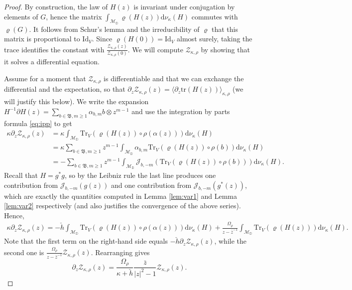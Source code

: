 \documentclass[12pt,a4paper]{amsart}
\numberwithin{equation}{section}
\newcounter{exa}
\theoremstyle{remark}
\theoremstyle{definition}
\newcommand{\D}{\mathbb D}
\renewcommand{\d}{\mathrm d}
\newcommand{\kB}{\mathfrak B}
\newcommand{\del}{\partial}
\newcommand{\cJ}{\mathcal J}
\newcommand{\cM}{\mathcal M}
\newcommand{\tr}{\mathrm{tr}}
\newcommand{\cZ}{\mathcal{Z}}
\begin{document}
\begin{proof}
By construction, the law of $H(z)$ is invariant under conjugation by elements of $G$, hence the matrix $\int_{\cM_\D}\varrho(H(z))\d\nu_\kappa(H)$ commutes with $\varrho(G)$. It follows from Schur's lemma and the irreducibility of $\varrho$ that this matrix is proportional to $\mathrm{Id}_V$. Since $\varrho(H(0))=\mathrm{Id}_V$ almost surely, taking the trace identifies the constant with $\frac{\cZ_{\kappa,\rho}(z)}{\cZ_{\kappa,\rho}(0)}$. We will compute $\cZ_{\kappa,\rho}$ by showing that it solves a differential equation.

    Assume for a moment that $\cZ_{\kappa,\rho}$ is differentiable and that we can exchange the differential and the expectation, so that $\del_z\cZ_{\kappa,\rho}(z)=\langle\del_z\tr(H(z))\rangle_{\kappa,\rho}$ (we will justify this below). We write the expansion $H^{-1}\del H(z)=\sum_{b\in\kB,m\geq1}\alpha_{b,m}b\otimes z^{m-1}$ and use the integration by parts formula \eqref{eq:ipp} to get
    \begin{align*}
    \kappa\del_z\cZ_{\kappa,\rho}(z)
    &=\kappa\int_{\cM_\D}\mathrm{Tr}_V(\varrho(H(z))\circ\rho(\alpha(z)))\d\nu_\kappa(H)\\
&=\kappa\sum_{b\in\kB,m\geq1}z^{m-1}\int_{\cM_\D}\alpha_{b,m}\mathrm{Tr}_V(\varrho(H(z))\circ\rho(b))\d\nu_\kappa(H)\\
    &=-\sum_{b\in\kB,m\geq1}z^{m-1}\int_{\cM_\D}\cJ_{b,-m}\left(\mathrm{Tr}_V(\varrho(H(z))\circ\rho(b))\right)\d\nu_\kappa(H).
    \end{align*}
Recall that $H=g^*g$, so by the Leibniz rule the last line produces one contribution from $\cJ_{b,-m}(g(z))$ and one contribution from $\cJ_{b,-m}(g^*(z))$, which are exactly the quantities computed in Lemma \ref{lem:var1} and Lemma \ref{lem:var2} respectively (and also justifies the convergence of the above series). Hence,
\begin{align*}
    \kappa\del_z\cZ_{\kappa,\rho}(z)=-\check h\int_{\cM_\D}\mathrm{Tr}_V(\varrho(H(z))\circ\rho(\alpha(z)))\d\nu_\kappa(H)+\frac{\Omega_\rho}{z-\bar z^{-1}}\int_{\cM_\D}\mathrm{Tr}_V(\varrho(H(z)))\d\nu_\kappa(H).
\end{align*}   
    Note that the first term on the right-hand side equals $-\check h\del_z\cZ_{\kappa,\rho}(z)$, while the second one is $\frac{\Omega_\rho}{z-\bar z^{-1}}\cZ_{\kappa,\rho}(z)$. Rearranging gives
    \begin{equation}\label{eq:diff-one-point}
    \del_z\cZ_{\kappa,\rho}(z)=\frac{\Omega_\rho}{\kappa+\check h}\frac{\bar z}{|z|^2-1}\cZ_{\kappa,\rho}(z).
    \end{equation}
    

\end{proof}
\end{document}
